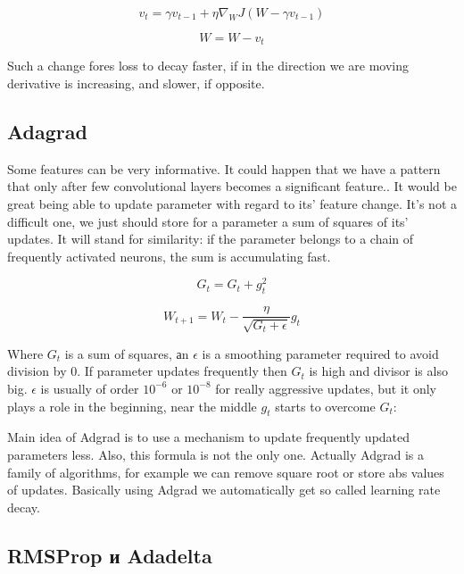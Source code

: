 \begin{equation}
    v_t = \gamma v_{t-1} + \eta \nabla_W J( W - \gamma v_{t-1} )
\end{equation}

\begin{equation}
    W = W - v_t
\end{equation}

Such a change fores loss to decay faster, if in the direction we are moving derivative is increasing, and slower, if opposite.

\subsection{Adagrad}

Some features can be very informative. It could happen that we have a pattern that only after few convolutional layers becomes a significant feature.. It would be great being able to update parameter with regard to its' feature change. It's not a difficult one, we just should store for a parameter a sum of squares of its' updates. It will stand for similarity: if the parameter belongs to a chain of frequently activated neurons, the sum is accumulating fast.

\begin{equation}
    G_{t} = G_{t} + g_{t}^2
\end{equation}

\begin{equation}
    W_{t+1} = W_{t} - \frac{\eta}{\sqrt{G_{t} + \epsilon}} g_{t}
\end{equation}

Where $G_{t}$ is a sum of squares, аn $\epsilon$ is a smoothing parameter required to avoid division by $0$. If parameter updates frequently then $G_t$ is high and divisor is also big. $\epsilon$ is usually of order $10^{-6}$ or $10^{-8}$ for really aggressive updates, but it only plays a role in the beginning, near the middle $g_t$ starts to overcome $G_t$:

Main idea of Adgrad \cite{adgrad} is to use a mechanism to update frequently updated parameters less. Also, this formula is not the only one. Actually Adgrad is a family of algorithms, for example we can remove square root or store abs values of updates. Basically using Adgrad we automatically get so called learning rate decay.

\subsection{RMSProp и Adadelta}

